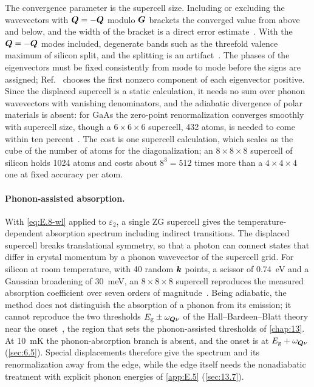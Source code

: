 The convergence parameter is the supercell size. Including or excluding the wavevectors with $\bm{Q} = -\bm{Q}$ modulo $\bm{G}$ brackets the converged value from above and below, and the width of the bracket is a direct error estimate~\cite[Sect.~VII\,B]{zacharias2020theory}. With the $\bm{Q} = -\bm{Q}$ modes included, degenerate bands such as the threefold valence maximum of silicon split, and the splitting is an artifact~\cite[Sect.~VII\,B]{zacharias2020theory}. The phases of the eigenvectors must be fixed consistently from mode to mode before the signs are assigned; Ref.~\cite[Sect.~II]{zacharias2016one} chooses the first nonzero component of each eigenvector positive. Since the displaced supercell is a static calculation, it needs no sum over phonon wavevectors with vanishing denominators, and the adiabatic divergence of polar materials is absent: for GaAs the zero-point renormalization converges smoothly with supercell size, though a $6\times6\times6$ supercell, 432 atoms, is needed to come within ten percent~\cite[Sect.~VII]{zacharias2020theory}. The cost is one supercell calculation, which scales as the cube of the number of atoms for the diagonalization; an $8\times8\times8$ supercell of silicon holds 1024 atoms and costs about $8^3 = 512$ times more than a $4\times4\times4$ one at fixed accuracy per atom.

\paragraph{Phonon-assisted absorption.} With \cref{eq:E.8-wl} applied to $\varepsilon_2$, a single ZG supercell gives the temperature-dependent absorption spectrum including indirect transitions. The displaced supercell breaks translational symmetry, so that a photon can connect states that differ in crystal momentum by a phonon wavevector of the supercell grid. For silicon at room temperature, with 40 random $\bm{k}$ points, a scissor of \SI{0.74}{eV} and a Gaussian broadening of \SI{30}{meV}, an $8\times8\times8$ supercell reproduces the measured absorption coefficient over seven orders of magnitude~\cite[Sect.~II and~VII]{zacharias2016one}. Being adiabatic, the method does not distinguish the absorption of a phonon from its emission; it cannot reproduce the two thresholds $E_{\mathrm{g}} \pm \omega_{\bm{Q}\nu}$ of the Hall--Bardeen--Blatt theory near the onset~\cite[Sect.~II]{zacharias2016one}, the region that sets the phonon-assisted thresholds of \cref{chap:13}. At \SI{10}{mK} the phonon-absorption branch is absent, and the onset is at $E_{\mathrm{g}} + \omega_{\bm{Q}\nu}$ (\cref{sec:6.5}). Special displacements therefore give the spectrum and its renormalization away from the edge, while the edge itself needs the nonadiabatic treatment with explicit phonon energies of \cref{app:E.5} (\cref{sec:13.7}).

